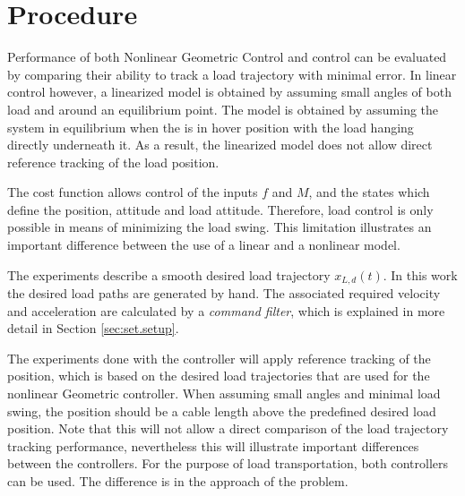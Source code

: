 \section{Procedure}\label{sec:set.proc}
Performance of both Nonlinear Geometric Control and  control can be evaluated by comparing their ability to track a load trajectory with minimal error. 
In linear control however, a linearized model is obtained by assuming small angles of both load and  around an equilibrium point. 
The model is obtained by assuming the system in equilibrium when the  is in hover position with the load hanging directly underneath it.
As a result, the linearized model does not allow direct reference tracking of the load position. 

The  cost function allows control of the inputs $ f $ and $ M $, and the states which define the  position,  attitude and load attitude. 
Therefore, load control is only possible in means of minimizing the load swing. This limitation illustrates an important difference between the use of a linear and a nonlinear model. 

The experiments describe a smooth desired load trajectory $ x_{L,d}(t) $.
In this work the desired load paths are generated by hand. The associated required velocity and acceleration are calculated by a \textit{command filter}, which is explained in more detail in Section \ref{sec:set.setup}.

The experiments done with the  controller will apply reference tracking of the  position, which is based on the desired load trajectories that are used for the nonlinear Geometric controller. When assuming small angles and minimal load swing, the  position should be a cable length above the predefined desired load position. 
Note that this will not allow a direct comparison of the load trajectory tracking performance, nevertheless this will illustrate important differences between the controllers. 
For the purpose of load transportation, both controllers can be used. The difference is in the approach of the problem.








